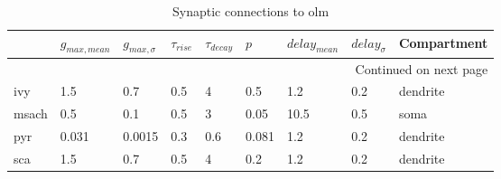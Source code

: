 \begin{longtable}{lllllllll}
\caption{Synaptic connections to olm}\label{olm_synapses}\\
\toprule
{} &   $g_{max, mean}$ & $g_{max, \sigma}$ & $\tau_{rise}$ & $\tau_{decay}$ &   $p$ & $delay_{mean}$ & $delay_{\sigma}$ & Compartment \\
\midrule
\endhead
\midrule
\multicolumn{9}{r}{{Continued on next page}} \\
\midrule
\endfoot

\bottomrule
\endlastfoot
ivy   &    1.5 &      0.7 &      0.5 &         4 &    0.5 &   1.2 &       0.2 &      dendrite\ \\
msach &    0.5 &      0.1 &      0.5 &         3 &   0.05 &  10.5 &       0.5 &               soma \\
pyr   &  0.031 &   0.0015 &      0.3 &       0.6 &  0.081 &   1.2 &       0.2 &      dendrite\ \\
sca   &    1.5 &      0.7 &      0.5 &         4 &    0.2 &   1.2 &       0.2 &      dendrite\ \\
\end{longtable}
